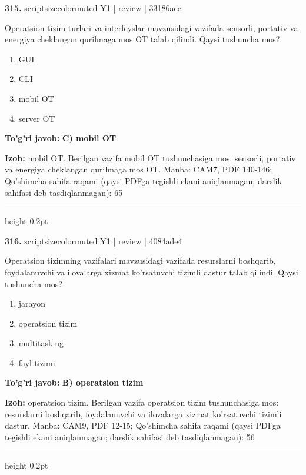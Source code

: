 \documentclass[10pt,a4paper]{article}
\begin{document}
{\bfseries\sffamily\color{ink} 315.} {scriptsizecolor{muted} Y1 | review | 33186aee}
\par
Operatsion tizim turlari va interfeyslar mavzusidagi vazifada sensorli, portativ va energiya cheklangan qurilmaga mos OT talab qilindi. Qaysi tushuncha mos?
\begin{enumerate}[label=\Alph*),leftmargin=9mm]
\item GUI
\item CLI
\item mobil OT
\item server OT
\end{enumerate}
\begin{tcolorbox}[enhanced,breakable,colback=teal!4,colframe=teal!60!black,boxrule=0.45pt,arc=1.2mm,left=2.7mm,right=2.7mm,top=1.8mm,bottom=1.8mm,before skip=2mm,after skip=2mm]
{\bfseries\sffamily\color{teal}To'g'ri javob:} \textbf{C) mobil OT}
\par\smallskip
{\bfseries Izoh:} mobil OT. Berilgan vazifa mobil OT tushunchasiga mos: sensorli, portativ va energiya cheklangan qurilmaga mos OT. Manba: CAM7, PDF 140-146; Qo'shimcha sahifa raqami (qaysi PDFga tegishli ekani aniqlanmagan; darslik sahifasi deb tasdiqlanmagan): 65
\end{tcolorbox}
\vspace{2mm}\hrule height 0.2pt\vspace{3mm}

{\bfseries\sffamily\color{ink} 316.} {scriptsizecolor{muted} Y1 | review | 4084ade4}
\par
Operatsion tizimning vazifalari mavzusidagi vazifada resurslarni boshqarib, foydalanuvchi va ilovalarga xizmat ko'rsatuvchi tizimli dastur talab qilindi. Qaysi tushuncha mos?
\begin{enumerate}[label=\Alph*),leftmargin=9mm]
\item jarayon
\item operatsion tizim
\item multitasking
\item fayl tizimi
\end{enumerate}
\begin{tcolorbox}[enhanced,breakable,colback=teal!4,colframe=teal!60!black,boxrule=0.45pt,arc=1.2mm,left=2.7mm,right=2.7mm,top=1.8mm,bottom=1.8mm,before skip=2mm,after skip=2mm]
{\bfseries\sffamily\color{teal}To'g'ri javob:} \textbf{B) operatsion tizim}
\par\smallskip
{\bfseries Izoh:} operatsion tizim. Berilgan vazifa operatsion tizim tushunchasiga mos: resurslarni boshqarib, foydalanuvchi va ilovalarga xizmat ko'rsatuvchi tizimli dastur. Manba: CAM9, PDF 12-15; Qo'shimcha sahifa raqami (qaysi PDFga tegishli ekani aniqlanmagan; darslik sahifasi deb tasdiqlanmagan): 56
\end{tcolorbox}
\vspace{2mm}\hrule height 0.2pt\vspace{3mm}
\end{document}
